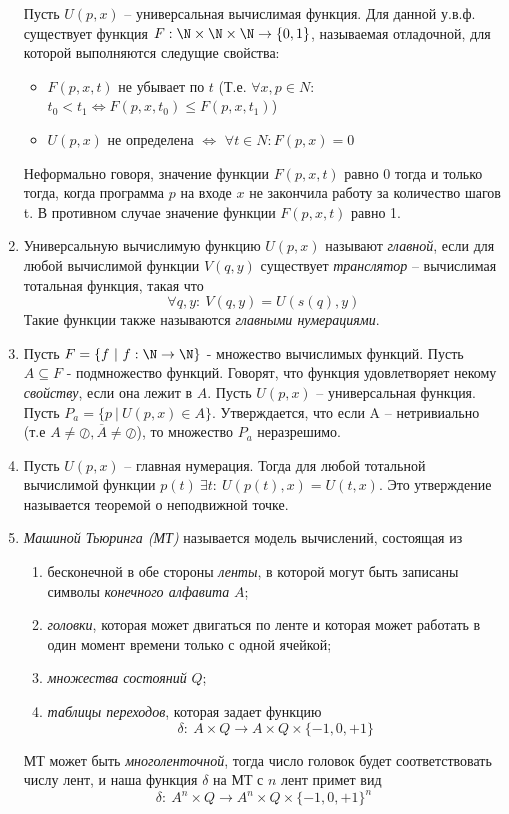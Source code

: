 \documentclass[a4paper,12pt]{article}
\begin{document}
\begin{enumerate}
    Пусть $U(p, x)$ -- универсальная вычислимая функция. Для данной у.в.ф. существует функция $F: \N \times \N \times \N \rightarrow \{0, 1\}$, называемая отладочной, для которой выполняются следущие свойства:
    \begin{itemize}
        \item $F(p, x, t)$ не убывает по $t$ (Т.е. $\forall x, p \in N:$ $t_0 < t_1 \Leftrightarrow F(p, x, t_0) \le F(p, x, t_1)$)
        
        \item $U(p, x)$ не определена $\Leftrightarrow$ $\forall t \in N: F(p, x) = 0$
    \end{itemize}
    
    Неформально говоря, значение функции $F(p, x, t)$ равно 0 тогда и только тогда, когда программа $p$ на входе $x$ не закончила работу за количество шагов t. В противном случае значение функции 
    $F(p, x, t)$ равно 1.
    
	\item 
	Универсальную вычислимую функцию $U(p, x)$ называют \textit{главной}, если для любой вычислимой функции $V(q, y)$ существует \textit{транслятор} -- вычислимая тотальная функция, такая что 
	\[
	\forall q, y: \ V(q, y) = U(s(q), y)
	\]
	Такие функции также называются \textit{главными нумерациями}.
	\item 
	Пусть $F = \{ f \ | \ f : \N \rightarrow \N \}$ - множество вычислимых функций. Пусть $A \subseteq F$ - подмножество функций. Говорят, что функция удовлетворяет некому \textit{свойству}, если она лежит в $A$. Пусть $U(p, x)$ -- универсальная функция. Пусть $P_a = \{ p \ | \ U(p, x) \in A \}$. Утверждается, что если A -- нетривиально (т.е $A \neq \oslash, \overline{A} \neq \oslash$), то множество $P_a$ неразрешимо.
   	\item 
    Пусть $U(p, x)$ -- главная нумерация. Тогда для любой тотальной вычислимой функции $p(t) \  \exists t: \ U(p(t), x) = U(t, x)$. Это утверждение называется теоремой о неподвижной точке.
   \item
   \textit{Машиной Тьюринга (МТ)} называется модель вычислений, состоящая из
   \begin{enumerate}
       \item бесконечной в обе стороны \textit{ленты}, в которой могут быть записаны символы \textit{конечного алфавита} $A$;
       \item \textit{головки}, которая может двигаться по ленте и которая может работать в один момент времени только с одной ячейкой;
       \item \textit{множества состояний} $Q$;
       \item \textit{таблицы переходов}, которая задает функцию 
       \[
       \delta: \ A \times Q \rightarrow A \times Q \times \{-1, 0, +1\}
       \]
   \end{enumerate}
   МТ может быть \textit{многоленточной}, тогда число головок будет соответствовать числу лент, и наша функция $\delta$ на МТ с $n$ лент примет вид
   \[
   \delta: \ A^n \times Q \rightarrow A^n \times Q \times \{-1, 0, +1\}^n
   \]
   

\end{enumerate}
\end{document}
